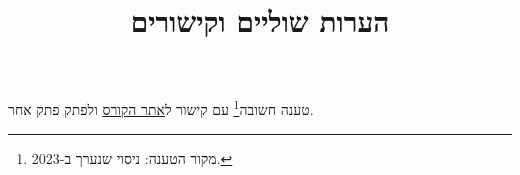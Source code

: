 \documentclass[11pt,a4paper]{article}
\title{הערות שוליים וקישורים}
\date{}
\begin{document}
\maketitle

טענה חשובה\footnote{מקור הטענה: ניסוי שנערך ב-2023.} עם קישור ל\href{https://example.com/course}{אתר הקורס} ולפתק פתק אחר.
\end{document}
